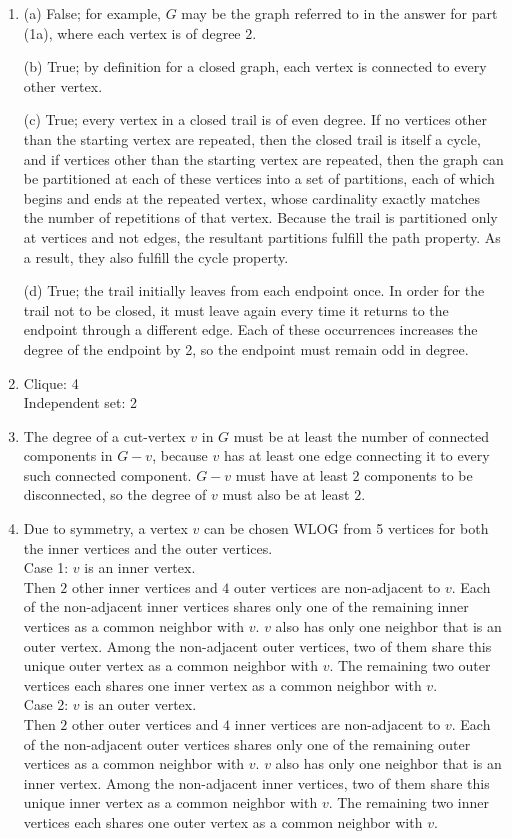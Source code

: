 \documentclass[a4paper,12pt]{article}
\begin{document}
\begin{enumerate}
\item (a) False; for example, $G$ may be the graph referred to in the answer for part (1a), where each vertex is of degree $2$. \par
(b) True; by definition for a closed graph, each vertex is connected to every other vertex. \par
(c) True; every vertex in a closed trail is of even degree. If no vertices other than the starting vertex are repeated, then the closed trail is itself a cycle, and if vertices other than the starting vertex are repeated, then the graph can be partitioned at each of these vertices into a set of partitions, each of which begins and ends at the repeated vertex, whose cardinality exactly matches the number of repetitions of that vertex. Because the trail is partitioned only at vertices and not edges, the resultant partitions fulfill the path property. As a result, they also fulfill the cycle property. \par
(d) True; the trail initially leaves from each endpoint once. In order for the trail not to be closed, it must leave again every time it returns to the endpoint through a different edge. Each of these occurrences increases the degree of the endpoint by 2, so the endpoint must remain odd in degree.

\item Clique: 4 \\
Independent set: 2 \par

\item The degree of a cut-vertex $v$ in $G$ must be at least the number of connected components in $G - v$, because $v$ has at least one edge connecting it to every such connected component. $G - v$ must have at least $2$ components to be disconnected, so the degree of $v$ must also be at least $2$.

\item Due to symmetry, a vertex $v$ can be chosen WLOG from 5 vertices for both the inner vertices and the outer vertices. \\
Case 1: $v$ is an inner vertex. \\
Then $2$ other inner vertices and $4$ outer vertices are non-adjacent to $v$. Each of the non-adjacent inner vertices shares only one of the remaining inner vertices as a common neighbor with $v$. $v$ also has only one neighbor that is an outer vertex. Among the non-adjacent outer vertices, two of them share this unique outer vertex as a common neighbor with $v$. The remaining two outer vertices each shares one inner vertex as a common neighbor with $v$. \\
Case 2: $v$ is an outer vertex. \\
Then $2$ other outer vertices and $4$ inner vertices are non-adjacent to $v$. Each of the non-adjacent outer vertices shares only one of the remaining outer vertices as a common neighbor with $v$. $v$ also has only one neighbor that is an inner vertex. Among the non-adjacent inner vertices, two of them share this unique inner vertex as a common neighbor with $v$. The remaining two inner vertices each shares one outer vertex as a common neighbor with $v$. \\

\end{enumerate}
\end{document}
